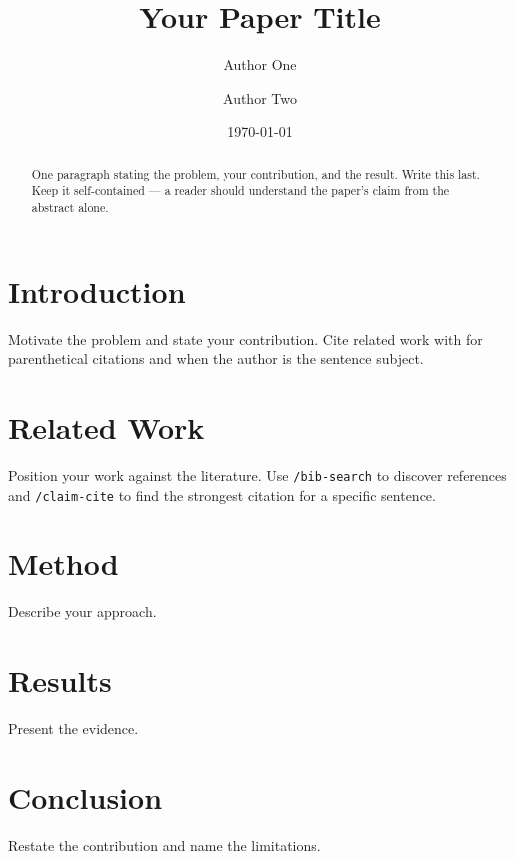 \documentclass[11pt]{article}
\title{Your Paper Title}
\author{Author One \and Author Two}
\date{\today}
\begin{document}
\maketitle

\begin{abstract}
One paragraph stating the problem, your contribution, and the result. Write this
last. Keep it self-contained --- a reader should understand the paper's claim
from the abstract alone.
\end{abstract}

\section{Introduction}
\label{sec:intro}
Motivate the problem and state your contribution. Cite related work with
\citep{example-key} for parenthetical citations and \citet{example-key} when the
author is the sentence subject.

\section{Related Work}
\label{sec:related}
Position your work against the literature. Use \verb|/bib-search| to discover
references and \verb|/claim-cite| to find the strongest citation for a specific
sentence.

\section{Method}
\label{sec:method}
Describe your approach.

\section{Results}
\label{sec:results}
Present the evidence.

\section{Conclusion}
\label{sec:conclusion}
Restate the contribution and name the limitations.


\end{document}
